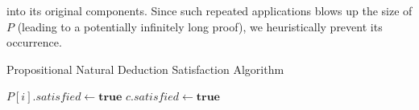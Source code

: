 \documentclass[ms]{uncgdissertationexp2}
\theoremstyle{plain}
\theoremstyle{definition}
\theoremstyle{remark}
\begin{document}
into its original components. Since such repeated applications blows up the size of $P$ (leading to a potentially infinitely long proof), we heuristically prevent its occurrence.

\begin{algorithm}
	\caption{Propositional Natural Deduction Satisfaction Algorithm}\label{euclid}
	\label{appendix:algorithm}
	\begin{algorithmic}[1]
		\State $P[i].satisfied\gets{\textbf{true}}$
		\EndIf
		\EndFor
		\State $c.satisfied\gets{\textbf{true}}$
		\EndIf
		\EndWhile
		\EndProcedure
	\end{algorithmic}
\end{algorithm}
\end{document}

